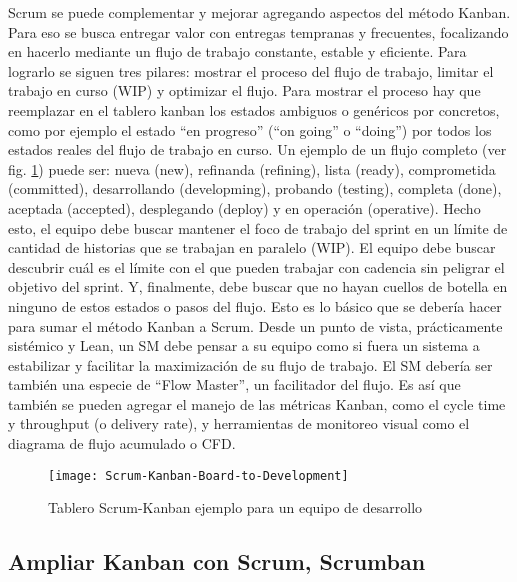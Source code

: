 Scrum se puede complementar y mejorar agregando aspectos del método Kanban. Para eso se busca entregar valor con entregas tempranas y frecuentes, focalizando en hacerlo mediante un flujo de trabajo constante, estable y eficiente. Para lograrlo se siguen tres pilares: mostrar el proceso del flujo de trabajo, limitar el trabajo en curso (WIP) y optimizar el flujo. Para mostrar el proceso hay que reemplazar en el tablero kanban los estados ambiguos o genéricos por concretos, como por ejemplo el estado “en progreso” (“on going” o “doing”) por todos los estados reales del flujo de trabajo en curso.  Un ejemplo de un flujo completo (ver fig. \ref{fig:Scrum-Kanban-Board-to-Development}) puede ser: nueva (new), refinanda (refining), lista (ready), comprometida (committed), desarrollando (developming), probando (testing), completa (done), aceptada (accepted), desplegando (deploy) y en operación (operative). Hecho esto, el equipo debe buscar mantener el foco de trabajo del sprint en un límite de cantidad de historias que se trabajan en paralelo (WIP). El equipo debe buscar descubrir cuál es el límite con el que pueden trabajar con cadencia sin peligrar el objetivo del sprint. Y, finalmente, debe buscar que no hayan cuellos de botella en ninguno de estos estados o pasos del flujo. Esto es lo básico que se debería hacer para sumar el método Kanban a Scrum. Desde un punto de vista, prácticamente sistémico y Lean, un SM debe pensar a su equipo como si fuera un sistema a estabilizar y facilitar la maximización de su flujo de trabajo. El SM debería ser también una especie de “Flow Master”, un facilitador del flujo. Es así que también se pueden agregar el manejo de las métricas Kanban, como el cycle time y throughput (o delivery rate), y herramientas de monitoreo visual como el diagrama de flujo acumulado o CFD.

\begin{figure}[h]
  \centering
  \texttt{[image: Scrum-Kanban-Board-to-Development]}
  \caption{Tablero Scrum-Kanban ejemplo para un equipo de desarrollo}
  \centering
  \label{fig:Scrum-Kanban-Board-to-Development} %
\end{figure}

\subsection{Ampliar Kanban con Scrum, Scrumban}

